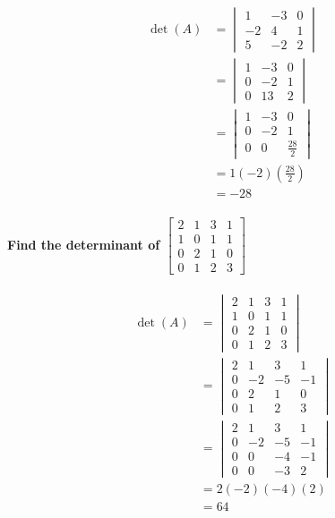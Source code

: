 \documentclass[
  letterpaper,
  DIV=11,
  numbers=noendperiod]{scrartcl}
\let\oldparagraph\paragraph
\renewcommand{\paragraph}[1]{\oldparagraph{#1}\mbox{}}
\begin{document}
\begin{align*}
\det(A) &= \begin{vmatrix}1 & -3 & 0 \\ -2 & 4 & 1 \\ 5 & -2 & 2 \end{vmatrix} \\
&= \begin{vmatrix}1 & -3 & 0 \\ 0 & -2 & 1 \\ 0 & 13 & 2 \end{vmatrix} \\
&= \begin{vmatrix}1 & -3 & 0 \\ 0 & -2 & 1 \\ 0 & 0 & \frac{28}{2} \end{vmatrix} \\
&= 1(-2)\left(\frac{28}{2}\right) \\
&= -28
\end{align*}

\newpage{}

\hypertarget{find-the-determinant-of-beginbmatrix-2-1-3-1-1-0-1-1-0-2-1-0-0-1-2-3endbmatrix}{%
\paragraph{\texorpdfstring{Find the determinant of
\(\begin{bmatrix} 2 & 1 & 3 & 1 \\ 1 & 0 & 1 & 1 \\ 0 & 2 & 1 & 0 \\ 0 & 1 & 2 & 3\end{bmatrix}\)}{Find the determinant of \textbackslash begin\{bmatrix\} 2 \& 1 \& 3 \& 1 \textbackslash\textbackslash{} 1 \& 0 \& 1 \& 1 \textbackslash\textbackslash{} 0 \& 2 \& 1 \& 0 \textbackslash\textbackslash{} 0 \& 1 \& 2 \& 3\textbackslash end\{bmatrix\}}}\label{find-the-determinant-of-beginbmatrix-2-1-3-1-1-0-1-1-0-2-1-0-0-1-2-3endbmatrix}}

\begin{align*}
\det(A) &= \begin{vmatrix} 2 & 1 & 3 & 1 \\ 1 & 0 & 1 & 1 \\ 0 & 2 & 1 & 0 \\ 0 & 1 & 2 & 3\end{vmatrix} \\
&= \begin{vmatrix} 2 & 1 & 3 & 1 \\ 0 & -2 & -5 & -1 \\ 0 & 2 & 1 & 0 \\ 0 & 1 & 2 & 3\end{vmatrix} \\
&= \begin{vmatrix} 2 & 1 & 3 & 1 \\ 0 & -2 & -5 & -1 \\ 0 & 0 & -4 & -1 \\ 0 & 0 & -3 & 2\end{vmatrix} \\
&= 2(-2)(-4)(2) \\
&= 64
\end{align*}
\end{document}
